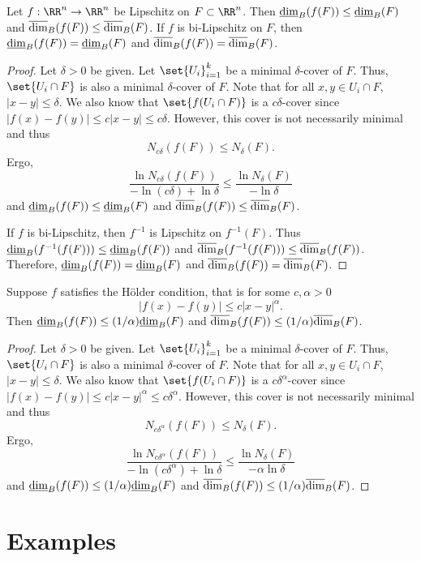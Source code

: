 \begin{thm}
	Let $f:\RR^n\rightarrow\RR^n$ be Lipschitz on $F\subset\RR^n$.
	Then $\underline{\operatorname{dim}}_B(f(F))\leq\underline{\operatorname{dim}}_B(F)$ and $\overline{\operatorname{dim}}_B(f(F))\leq\overline{\operatorname{dim}}_B(F)$.
	If $f$ is bi-Lipschitz on $F$, then $\underline{\operatorname{dim}}_B(f(F))=\underline{\operatorname{dim}}_B(F)$ and $\overline{\operatorname{dim}}_B(f(F))=\overline{\operatorname{dim}}_B(F)$.
\end{thm}
\begin{proof}
	Let $\delta > 0$ be given.
	Let $\set{U_i}_{i=1}^k$ be a minimal $\delta$-cover of $F$.
	Thus, $\set{U_i\cap F}$ is also a minimal $\delta$-cover of $F$.
	Note that for all $x,y\in U_i\cap F$, $|x-y|\leq \delta$.
	We also know that $\set{f(U_i\cap F)}$ is a $c\delta$-cover since $|f(x)-f(y)|\leq c|x-y|\leq c\delta$.
	However, this cover is not necessarily minimal and thus
	\[
		N_{c\delta}(f(F))\leq N_\delta(F).
	\]
	Ergo,
	\[
		\frac{\ln N_{c\delta}(f(F))}{-\ln(c\delta)+\ln\delta}\leq\frac{\ln N_\delta(F)}{-\ln\delta}
	\]
	and $\underline{\operatorname{dim}}_B(f(F))\leq\underline{\operatorname{dim}}_B(F)$ and $\overline{\operatorname{dim}}_B(f(F))\leq\overline{\operatorname{dim}}_B(F)$.
	
	If $f$ is bi-Lipschitz, then $f^{-1}$ is Lipschitz on $f^{-1}(F)$.
	Thus $\underline{\operatorname{dim}}_B(f^{-1}(f(F)))\leq\underline{\operatorname{dim}}_B(f(F))$ and $\overline{\operatorname{dim}}_B(f^{-1}(f(F)))\leq\overline{\operatorname{dim}}_B(f(F))$.
	Therefore, $\underline{\operatorname{dim}}_B(f(F))=\underline{\operatorname{dim}}_B(F)$ and $\overline{\operatorname{dim}}_B(f(F))=\overline{\operatorname{dim}}_B(F)$.
\end{proof}

\begin{thm}
	Suppose $f$ satisfies the H\"{o}lder condition, that is for some $c,\alpha>0$
	\[
		|f(x)-f(y)|\leq c|x-y|^\alpha.
	\]
	Then $\underline{\operatorname{dim}}_B(f(F))\leq(1/\alpha)\underline{\operatorname{dim}}_B(F)$ and $\overline{\operatorname{dim}}_B(f(F))\leq(1/\alpha)\overline{\operatorname{dim}}_B(F)$.
\end{thm}
\begin{proof}
	Let $\delta > 0$ be given.
	Let $\set{U_i}_{i=1}^k$ be a minimal $\delta$-cover of $F$.
	Thus, $\set{U_i\cap F}$ is also a minimal $\delta$-cover of $F$.
	Note that for all $x,y\in U_i\cap F$, $|x-y|\leq \delta$.
	We also know that $\set{f(U_i\cap F)}$ is a $c\delta^\alpha$-cover since $|f(x)-f(y)|\leq c|x-y|^\alpha\leq c\delta^\alpha$.
	However, this cover is not necessarily minimal and thus
	\[
		N_{c\delta^\alpha}(f(F))\leq N_\delta(F).
	\]
	Ergo,
	\[
		\frac{\ln N_{c\delta^\alpha}(f(F))}{-\ln(c\delta^\alpha)+\ln\delta}\leq\frac{\ln N_\delta(F)}{-\alpha\ln\delta}
	\]
	and $\underline{\operatorname{dim}}_B(f(F))\leq(1/\alpha)\underline{\operatorname{dim}}_B(F)$ and $\overline{\operatorname{dim}}_B(f(F))\leq(1/\alpha)\overline{\operatorname{dim}}_B(F)$.
\end{proof}

\section{Examples}

